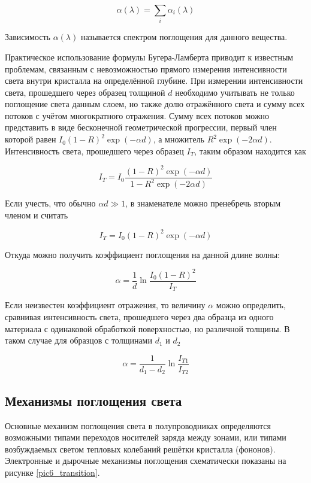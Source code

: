 \begin{equation}
\alpha(\lambda) = \sum\limits_{i}{\alpha_{i}(\lambda)}
\label{eq6_alphasum}
\end{equation}

Зависимость $\alpha(\lambda)$ называется спектром поглощения для данного вещества.

Практическое использование формулы Бугера-Ламберта приводит к известным проблемам, связанным с невозможностью прямого измерения интенсивности света внутри кристалла на определённой глубине. При измерении интенсивности света, прошедшего через образец толщиной $d$ необходимо учитывать не только поглощение света данным слоем, но также долю отражённого света и сумму всех потоков с учётом многократного отражения. Сумму всех потоков можно представить в виде бесконечной геометрической прогрессии, первый член которой равен $I_{0} (1-R)^2 \exp(-\alpha d)$, а множитель $R^2 \exp(-2 \alpha d)$. Интенсивность света, прошедшего через образец $I_{T}$, таким образом находится как

\begin{equation}
I_{T} = I_{0} \frac{(1-R)^2 \exp(-\alpha d)}{1 - R^2 \exp(-2 \alpha d)}
\end{equation}

Если учесть, что обычно $\alpha d \gg 1$, в знаменателе можно пренебречь вторым членом и считать

\begin{equation}
I_{T} = I_{0} (1-R)^2 \exp(-\alpha d)
\end{equation}

Откуда можно получить коэффициент поглощения на данной длине волны:

\begin{equation}
\alpha = \frac{1}{d} \ln \frac{I_{0} (1-R)^2}{I_{T}}
\label{eq6_alpha_T}
\end{equation}

Если неизвестен коэффициент отражения, то величину $\alpha$ можно определить, сравнивая интенсивность света, прошедшего через два образца из одного материала с одинаковой обработкой поверхностью, но различной толщины. В таком случае для образцов с толщинами $d_{1}$ и $d_{2}$

\begin{equation}
\alpha = \frac{1}{d_{1}-d_{2}} \ln \frac{I_{T1}}{I_{T2}}
\end{equation}

\subsection{Механизмы поглощения света}
Основные механизм поглощения света в полупроводниках определяются возможными типами переходов носителей заряда между зонами, или типами возбуждаемых светом тепловых колебаний решётки кристалла (фононов). Электронные и дырочные механизмы поглощения схематически показаны на рисунке \ref{pic6_transition}.

